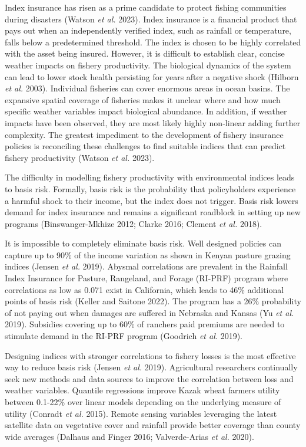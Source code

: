 \documentclass[
  letterpaper,
  DIV=11,
  numbers=noendperiod]{scrartcl}
\begin{document}
Index insurance has risen as a prime candidate to protect fishing
communities during disasters (Watson \emph{et al.} 2023). Index
insurance is a financial product that pays out when an independently
verified index, such as rainfall or temperature, falls below a
predetermined threshold. The index is chosen to be highly correlated
with the asset being insured. However, it is difficult to establish
clear, concise weather impacts on fishery productivity. The biological
dynamics of the system can lead to lower stock health persisting for
years after a negative shock (Hilborn \emph{et al.} 2003). Individual
fisheries can cover enormous areas in ocean basins. The expansive
spatial coverage of fisheries makes it unclear where and how much
specific weather variables impact biological abundance. In addition, if
weather impacts have been observed, they are most likely highly
non-linear adding further complexity. The greatest impediment to the
development of fishery insurance policies is reconciling these
challenges to find suitable indices that can predict fishery
productivity (Watson \emph{et al.} 2023).

The difficulty in modelling fishery productivity with environmental
indices leads to basis risk. Formally, basis risk is the probability
that policyholders experience a harmful shock to their income, but the
index does not trigger. Basis risk lowers demand for index insurance and
remains a significant roadblock in setting up new programs
(Binswanger-Mkhize 2012; Clarke 2016; Clement \emph{et al.} 2018).

It is impossible to completely eliminate basis risk. Well designed
policies can capture up to 90\% of the income variation as shown in
Kenyan pasture grazing indices (Jensen \emph{et al.} 2019). Abysmal
correlations are prevalent in the Rainfall Index Insurance for Pasture,
Rangeland, and Forage (RI-PRF) program where correlations as low as
0.071 exist in California, which leads to 46\% additional points of
basis risk (Keller and Saitone 2022). The program has a 26\% probability
of not paying out when damages are suffered in Nebraska and Kansas (Yu
\emph{et al.} 2019). Subsidies covering up to 60\% of ranchers paid
premiums are needed to stimulate demand in the RI-PRF program (Goodrich
\emph{et al.} 2019).

Designing indices with stronger correlations to fishery losses is the
most effective way to reduce basis risk (Jensen \emph{et al.} 2019).
Agricultural researchers continually seek new methods and data sources
to improve the correlation between loss and weather variables. Quantile
regressions improve Kazak wheat farmers utility between 0.1-22\% over
linear models depending on the underlying measure of utility (Conradt
\emph{et al.} 2015). Remote sensing variables leveraging the latest
satellite data on vegetative cover and rainfall provide better coverage
than county wide averages (Dalhaus and Finger 2016; Valverde-Arias
\emph{et al.} 2020).
\end{document}
